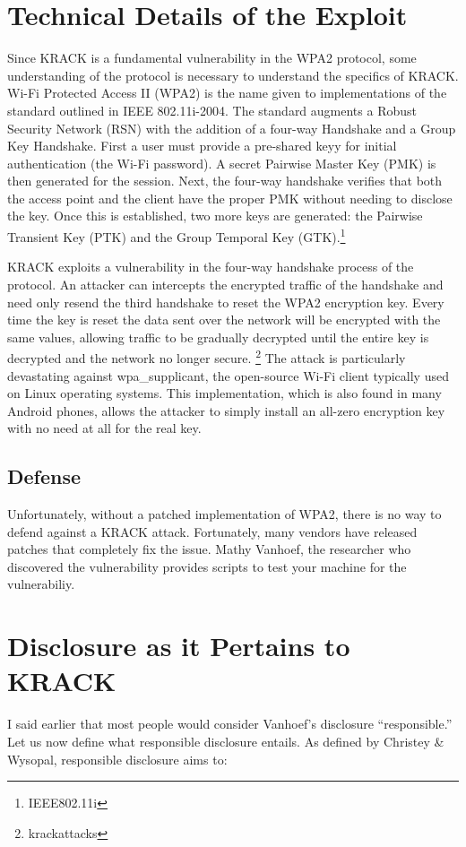 \documentclass[12pt]{article}
\begin{document}
\begin{doublespace}
\section*{Technical Details of the Exploit}
Since KRACK is a fundamental vulnerability in the WPA2 protocol, some
understanding of the protocol is necessary to understand the specifics of
KRACK. Wi-Fi Protected Access II (WPA2) is the name given to implementations of
the standard outlined in IEEE 802.11i-2004. The standard augments a Robust
Security Network (RSN) with the addition of a four-way Handshake and a Group
Key Handshake. First a user must provide a pre-shared keyy for initial
authentication (the Wi-Fi password). A secret Pairwise Master Key (PMK) is then
generated for the session. Next, the four-way handshake verifies that both the
access point and the client have the proper PMK without needing to disclose the
key. Once this is established, two more keys are generated: the Pairwise
Transient Key (PTK) and the Group Temporal Key (GTK).\footnote{IEEE802.11i}

KRACK exploits a vulnerability in the four-way handshake process of the
protocol. An attacker can intercepts the encrypted traffic of the handshake and
need only resend the third handshake to reset the WPA2 encryption key. Every
time the key is reset the data sent over the network will be encrypted with
the same values, allowing traffic to be gradually decrypted until the entire
key is decrypted and the network no longer secure. \footnote{krackattacks} The
attack is particularly devastating against wpa\_supplicant, the open-source
Wi-Fi client typically used on Linux operating systems. This implementation,
which is also found in many Android phones, allows the attacker to simply
install an all-zero encryption key with no need at all for the real key.

\subsection*{Defense}
Unfortunately, without a patched implementation of WPA2, there is no way to
defend against a KRACK attack. Fortunately, many vendors have released patches
that completely fix the issue. Mathy Vanhoef, the researcher who discovered the
vulnerability provides scripts to test your machine for the vulnerabiliy.

\section*{Disclosure as it Pertains to KRACK}
I said earlier that most people would consider Vanhoef's disclosure
``responsible.'' Let us now define what responsible disclosure entails. As
defined by Christey \& Wysopal, responsible disclosure aims to:
\end{doublespace}
\end{document}
